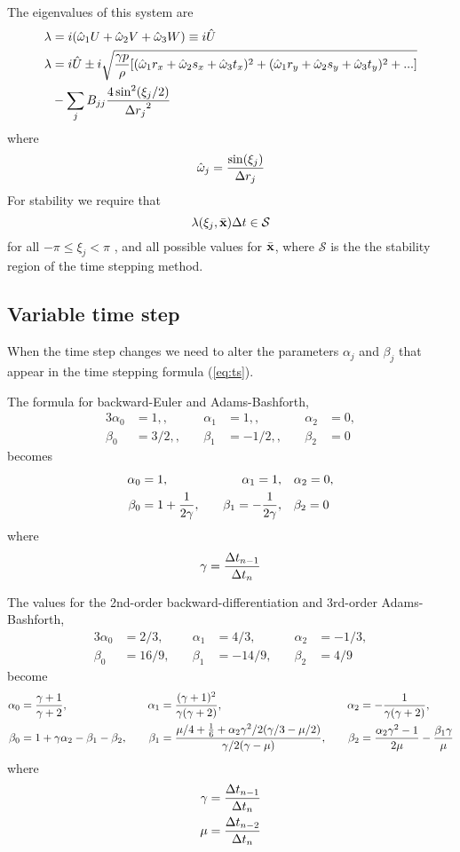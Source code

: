 \documentclass{article}
\begin{document}
\newcommand{\omegah}{{\hat{\omega}}}
The eigenvalues of this system are
\begin{align}
  \lambda & = i ( \omegah_1 U + \omegah_2 V + \omegah_3 W ) \equiv i \hat{U} \\
  \lambda & = i \hat{U} \pm i \sqrt{ {\gamma p \over \rho}
         [ (\omegah_1 r_x + \omegah_2 s_x + \omegah_3 t_x)^2
          +(\omegah_1 r_y + \omegah_2 s_y + \omegah_3 t_y)^2 + ... ] }   \\
    &     - \sum_j B_{jj}  {4 \sin^2( \xi_j/2)\over {\Delta r_j}^2 }
\end{align}
where
\[
    \omegah_j = { \sin(\xi_j) \over \Delta r_j }
\]
For stability we require that
\[
     \lambda(\xi_j,\bar{{\bf x}}) {\Delta t} \in \mathcal{S}
\]
for all $-\pi \le \xi_j < \pi$ , and all possible values for $\bar{{\bf x}}$,
where $\mathcal{S}$ is the 
the stability region of the time stepping method.



\subsection{Variable time step}

When the time step changes we need to alter the parameters $\alpha_j$ and $\beta_j$
that appear in the time stepping formula (\ref{eq:ts}).


The formula for backward-Euler and Adams-Bashforth,
\begin{alignat*}{3}
 \alpha_0&=1, , &\quad \alpha_1&=1, , &\quad \alpha_2&=0, \\
 \beta_0&=3/2,, &\quad  \beta_1&=-1/2, , &\quad \beta_2&=0
\end{alignat*}
becomes
\begin{alignat}{3}
\alpha_0&=1,  &\quad \alpha_1=1,   &\quad  \alpha_2=0, \\
\beta_0&=1+{1\over 2\gamma},  &\quad \beta_1=-{1\over 2\gamma}, &\quad \beta_2=0
\end{alignat}
where
\[
   \gamma = { \Delta t_{n-1} \over \Delta t_{n} }
\]

The values for the 2nd-order backward-differentiation and 3rd-order Adams-Bashforth,
\begin{alignat*}{3}
 \alpha_0&=2/3, &\quad \alpha_1&=4/3,  &\quad \alpha_2&=-1/3, \\
 \beta_0&=16/9,  &\quad \beta_1&=-14/9, &\quad  \beta_2&=4/9 
\end{alignat*}
become
\begin{alignat}{3}
 \alpha_0&={\gamma+1\over \gamma+2}, &\quad \alpha_1&={(\gamma+1)^2\over \gamma(\gamma+2)},  
                                      &\quad \alpha_2&=-{1\over \gamma(\gamma+2)}, \\
 \beta_0 &=1+\gamma\alpha_2-\beta_1-\beta_2,        &\quad 
 \beta_1 &={ \mu/4 +{1\over 6} + \alpha_2\gamma^2/2(\gamma/3-\mu/2) \over \gamma/2(\gamma-\mu)}, &\quad 
 \beta_2 &={\alpha_2\gamma^2-1\over 2\mu} -{\beta_1\gamma \over \mu}
\end{alignat}
where
\begin{align*}
   \gamma & = { \Delta t_{n-1} \over \Delta t_{n} } \\
   \mu & = { \Delta t_{n-2} \over \Delta t_{n} } 
\end{align*}
\end{document}
